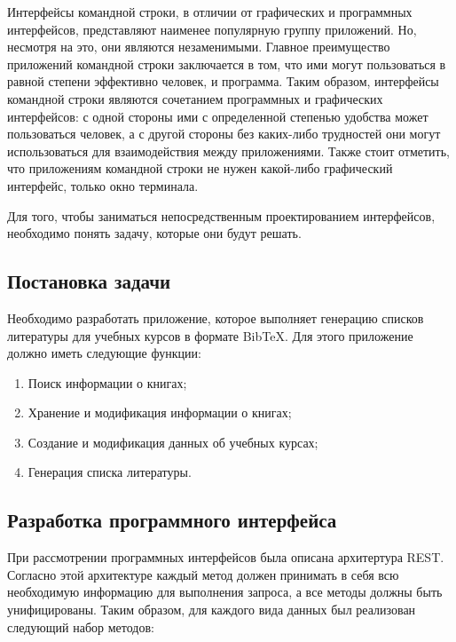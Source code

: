 Интерфейсы командной строки, в отличии от графических и программных интерфейсов, представляют
наименее популярную группу приложений. Но, несмотря на это, они являются
незаменимыми. Главное преимущество приложений командной строки заключается в том, что
ими могут пользоваться в равной степени эффективно человек, и программа. Таким образом,
интерфейсы командной строки являются сочетанием программных и графических интерфейсов:
с одной стороны ими с определенной степенью удобства может пользоваться человек, а с другой
стороны без каких-либо трудностей они могут использоваться для взаимодействия между
приложениями. Также стоит отметить, что приложениям командной строки не нужен какой-либо
графический интерфейс, только окно терминала.

Для того, чтобы заниматься непосредственным проектированием интерфейсов, необходимо
понять задачу, которые они будут решать.

\subsection*{Постановка задачи}

Необходимо разработать приложение, которое выполняет генерацию списков литературы
для учебных курсов в формате BibTeX. Для этого приложение должно иметь следующие функции:

\begin{enumerate}
    \item Поиск информации о книгах;
    \item Хранение и модификация информации о книгах;
    \item Создание и модификация данных об учебных курсах;
    \item Генерация списка литературы.
\end{enumerate}

\subsection*{Разработка программного интерфейса}

При рассмотрении программных интерфейсов была описана архитертура REST. Согласно
этой архитектуре каждый метод должен принимать в себя всю необходимую информацию
для выполнения запроса, а все методы должны быть унифицированы. Таким образом, для каждого
вида данных был реализован следующий набор методов:

